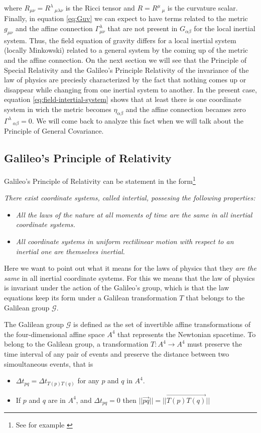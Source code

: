 \documentclass[11pt, letterpaper]{article}
\begin{document}
where $R_{\mu\nu}=R^\lambda\,_{\mu\lambda\nu}$ is the Ricci tensor and $R=R^\mu\,_\mu$ is the curvature scalar. Finally, in equation \ref{eq:Guv} we can expect to have terms related to the metric $g_{\mu\nu}$ and the affine connection $\Gamma^\lambda_{\mu\nu}$ that are not present in $G_{\alpha\beta}$ for the local inertial system. Thus, the field equation of gravity differs for a local inertial system (locally Minkowski) related to a general system by the coming up of the metric and the affine connection. On the next section we will see that the Principle of Special Relativity and the Galileo's Principle Relativity of the invariance of the law of physics are preciesly characterized by the fact that nothing comes up or disappear while changing from one inertial system to another. In the present case, equation \ref{eq:field-intertial-system} shows that at least there is one coordinate system in wich the metric becomes $\eta_{\alpha\beta}$ and the affine connection becames zero $\Gamma^\lambda\,_{\alpha\beta}=0$. We will come back to analyze this fact when we will talk about the Principle of General Covariance.

\subsection*{Galileo's Principle of Relativity}
Galileo's Principle of Relativity can be statement in the form\footnote{See for example \cite{arnold}}

\textit{There exist coordinate systems, called intertial, possesing the following properties:}
\begin{itemize}
	\item[\textit{1}] \textit{All the laws of the nature at all moments of time are the same in all inertial coordinate systems.}
	\item[\textit{2}] \textit{All coordinate systems in uniform rectilinear motion with respect to an inertial one are themselves inertial.}
\end{itemize}

Here we want to point out what it means for the laws of physics that they \textit{are the same} in all inertial coordinate systems. For this we means that the law of physics is invariant under the action of the Galileo's group, which is that the law equations keep its form under a Galilean transformation $T$ that belongs to the Galilean group $\mathscr{G}$.

The Galilean group $\mathscr{G}$ is defined as the set of invertible affine transformations of the four-dimensional affine space $A^4$ that represents the Newtonian spacetime. To belong to the Galilean group, a transformation ${T:A^4\to A^4}$ must preserve the time interval of any pair of events and preserve the distance between two simoultaneous events, that is
\begin{itemize}
	\item[1.] $\Delta  t_{pq} = \Delta t_{T(p)T(q)}
$ for any $p$ and $q$ in $A^4$.
	\item[2.] If $p$ and $q$ are in $A^4$, and $\Delta t_{pq}=0$ then $||\overrightarrow{pq}||=|| \overrightarrow{T(p)T(q)}||$
\end{itemize}
\end{document}
